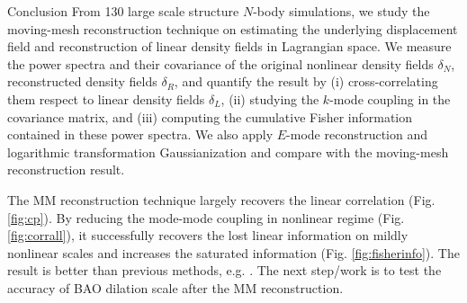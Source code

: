 \begin{section}{Conclusion}
  \label{sec:conclusion}
  From 130 large scale structure $N$-body simulations, 
  we study the moving-mesh reconstruction technique on estimating the underlying displacement
  field and reconstruction of linear density fields in Lagrangian
  space. We measure the power spectra and their covariance of
  the original nonlinear density fields $\delta_N$, reconstructed density fields $\delta_R$,
  and quantify the result by (i) cross-correlating them respect to linear density fields $\delta_L$,
  (ii) studying the $k$-mode coupling in the covariance matrix, and (iii)
  computing the cumulative Fisher information contained
  in these power spectra. We also apply $E$-mode reconstruction
  and logarithmic transformation Gaussianization and compare
  with the moving-mesh reconstruction result.
  
  The MM reconstruction technique largely recovers the linear correlation
  (Fig. \ref{fig:cp}).  By reducing the mode-mode coupling in nonlinear
  regime (Fig. \ref{fig:corrall}), it successfully recovers the lost linear
  information on mildly nonlinear scales and increases the saturated
  information (Fig. \ref{fig:fisherinfo}).  The result is
  better than previous methods,
  e.g. \cite{bib:Mark2006,bib:Mark2009,bib:Zhang2011,bib:Yu2012}.
  The next step/work is to test the accuracy of BAO dilation scale after the MM reconstruction.

\end{section}
